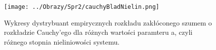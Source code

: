 \documentclass[12pt,a4paper]{article}
\begin{document}
\begin{figure}[H]
\centering
\texttt{[image: ../Obrazy/Spr2/cauchyBladNielin.png]} 
\caption{Wykresy dystrybuant empirycznych rozkładu zakłóconego szumem o rozkładzie Cauchy'ego dla różnych wartości paramteru a, czyli różnego stopnia nieliniowości systemu.}
\label{fig:bladCauchyDistNielin}
\end{figure}

\nocite{rachunek2006jakubowski}
\nocite{generatory1997Wieczorkowski}
\nocite{wstep2001jakubowski}
 

\end{document}
